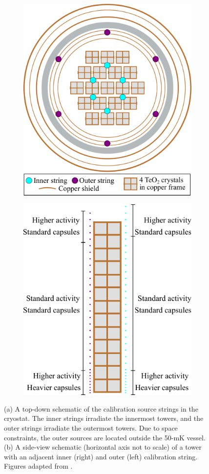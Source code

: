 \begin{figure}[htpb]
\begin{center}
\begin{subfigure}[b]{0.5\textwidth}
    \includegraphics[height=3.25 in]{Figures/CUORE_calibration_location.pdf}
    \caption{}
    \label{fig:Calibration_source_top_view}
\end{subfigure}
\begin{subfigure}[b]{0.40\textwidth}
\includegraphics[height = 3.5 in]{Figures/Cuore_tower_calibration.pdf}
\caption{}
\label{fig:Calibration_source_tower}
\end{subfigure}
\end{center}
\caption[(a) A top-down schematic of the calibration source strings in the cryostat.
(b) A side-view schematic of an inner and outer calibration string next to a tower]
    {(a) A top-down schematic of the calibration source strings in the cryostat.
    The inner strings irradiate the innermost towers, and the outer strings irradiate the outermost towers.
    Due to space constraints, the outer sources are located outside the 50-mK vessel.
    (b) A side-view schematic (horizontal axis not to scale) of a tower with an adjacent inner (right) and outer (left)  calibration string.
    Figures adapted from \cite{Cushman:2016cnv}.}
\label{fig:Calibration_source_locations}
\end{figure}

